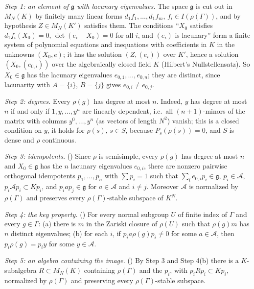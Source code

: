 \emph{Step 1: an element of $\mathfrak g$ with lacunary eigenvalues.} The space $\mathfrak g$ is cut out in $M_N(K)$ by
finitely many linear forms $d_1f_1,\dots,d_1f_m$, $f_i\in I(\rho(\Gamma))$, and by hypothesis $Z\in M_N(K')$ satisfies
them. The conditions ``$X_0$ satisfies $d_1f_i(X_0)=0$, $\det(e_i-X_0)=0$ for all $i$, and $(e_i)$ is lacunary'' form a
finite system of polynomial equations and inequations with coefficients in $K$ in the unknowns $(X_0,e)$; it has the
solution $(Z,(e_i))$ over $K'$, hence a solution $(X_0,(e_{0,i}))$ over the algebraically closed field $K$ (Hilbert's
Nullstellensatz). So $X_0\in\mathfrak g$ has the lacunary eigenvalues $e_{0,1},\dots,e_{0,n}$; they are distinct, since
lacunarity with $A=\{i\}$, $B=\{j\}$ gives $e_{0,i}\ne e_{0,j}$.

\emph{Step 2: degrees.} Every $\rho(g)$ has degree at most $n$. Indeed, $y$ has degree at most $n$ if and only if
$1,y,\dots,y^n$ are linearly dependent, i.e.\ all $(n+1)$-minors of the matrix with columns $y^0,\dots,y^n$ (as vectors
of length $N^2$) vanish; this is a closed condition on $y$, it holds for $\rho(s)$, $s\in S$, because $P_s(\rho(s))=0$, and
$S$ is dense and $\rho$ continuous.

\emph{Step 3: idempotents.} () Since $\rho$ is semisimple,
every $\rho(g)$ has degree at most $n$ and $X_0\in\mathfrak g$ has the $n$ lacunary eigenvalues $e_{0,i}$, there are
nonzero pairwise orthogonal idempotents $p_1,\dots,p_n$ with $\sum p_i=1$ such that $\sum_ie_{0,i}p_i\in\mathfrak g$, $p_i\in
\mathcal A$, $p_i\mathcal Ap_i\subset Kp_i$, and $p_iap_j\in\mathfrak g$ for $a\in\mathcal A$ and $i\ne j$. Moreover
$\mathcal A$ is normalized by $\rho(\Gamma)$ and preserves every $\rho(\Gamma)$-stable subspace of $K^N$.

\emph{Step 4: the key property.} () For every normal
subgroup $U$ of finite index of $\Gamma$ and every $g\in\Gamma$: (a) there is $m$ in the Zariski closure of $\rho(U)$ such
that $\rho(g)m$ has $n$ distinct eigenvalues; (b) for each $i$, if $p_ia\rho(g)p_i\ne0$ for some $a\in\mathcal A$, then
$p_i\rho(g)=p_iy$ for some $y\in\mathcal A$.

\emph{Step 5: an algebra containing the image.} ()
By Step 3 and Step 4(b) there is a $K$-subalgebra $R\subset M_N(K)$ containing $\rho(\Gamma)$ and the $p_i$, with
$p_iRp_i\subset Kp_i$, normalized by $\rho(\Gamma)$ and preserving every $\rho(\Gamma)$-stable subspace.

